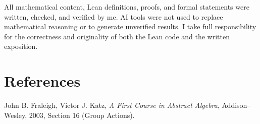 \documentclass[
  12pt, %
]{assignment}
\begin{document}
All mathematical content, Lean definitions, proofs, and formal statements were written, checked, and verified by me. AI tools were not used to replace mathematical reasoning or to generate unverified results. I take full responsibility for the correctness and originality of both the Lean code and the written exposition.


\section{References}
John B. Fraleigh, Victor J. Katz, \textit{A First Course in Abstract Algebra},
Addison--Wesley, 2003, Section 16 (Group Actions).
\end{document}
